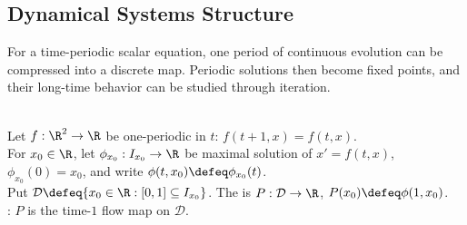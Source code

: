 \subsection{Dynamical Systems Structure}

For a time-periodic scalar equation, one period of continuous evolution can be compressed into a discrete map. Periodic solutions then become fixed points, and their long-time behavior can be studied through iteration.

\begin{definition} \label{def:scalar-poincare-map} \\
Let $f:\R^2\to\R$ be one-periodic in $t$: $f(t+1,x)=f(t,x)$.\\
For $x_0\in\R$, let $\phi_{x_0}:I_{x_0}\to\R$ be maximal solution of $x'=f(t,x)$, $\phi_{x_0}(0)=x_0$, and write $\phi(t,x_0)\defeq\phi_{x_0}(t)$.\\
Put $\mathcal{D}\defeq\{x_0\in\R:[0,1]\subseteq I_{x_0}\}$. The  is $P:\mathcal{D}\to\R$, $P(x_0)\defeq\phi(1,x_0)$.\\
: $P$ is the time-$1$ flow map on $\mathcal{D}$.
\end{definition}

